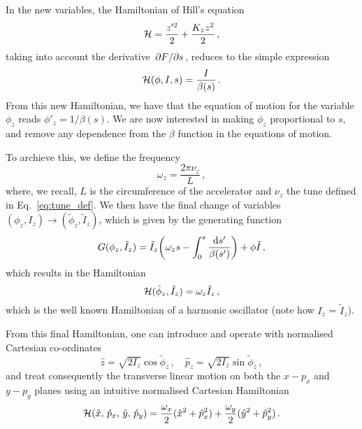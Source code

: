 In the new variables, the Hamiltonian of Hill's equation
\begin{equation} 
    \mathcal{H} = \frac{z'^2}{2} + \frac{K_z z^2}{2} \,,
\end{equation}
taking into account the derivative $\pdv*{F}{s}$, reduces to the simple expression
\begin{equation}
	\mathcal{H}(\phi,I,s) = \frac{I}{\beta(s)}\, .
\end{equation}
From this new Hamiltonian, we have that the equation of motion for the variable $\phi_z$ reads $\phi'_z = 1/\beta(s)$. We are now interested in making $\phi_z$ proportional to $s$, and remove any dependence from the $\beta$ function in the equations of motion.

To archieve this, we define the frequency
\begin{equation}
    \omega_z = \frac{2\pi\nu_z}{L} \,,
\end{equation}
where, we recall, $L$ is the circumference of the accelerator and $\nu_z$ the tune defined in Eq.~\eqref{eq:tune_def}. We then have the final change of variables $(\phi_z,I_z)\to(\tilde\phi_z, \tilde I_z)$, which is given by the generating function
%
\begin{equation}
	G(\phi_z,\tilde I_z) = \tilde I_z\qty(\omega_z s - \int_0^s\frac{\dd s'}{\beta(s')})+\phi\tilde I\, ,
\end{equation}
%
which results in the Hamiltonian
%
\begin{equation}
	\mathcal{H}(\tilde \phi_z,\tilde I_z) = \omega_z \tilde I_z\,,
	\label{eq:harm_ham}
 \end{equation}
%
which is the well known Hamiltonian of a harmonic oscillator (note how $I_z$ = $\tilde{I}_z$).

From this final Hamiltonian, one can introduce and operate with normalised Cartesian co-ordinates 
\begin{equation}
    \hat z=\sqrt{2I_z}\cos\tilde{\phi}_z\,,\quad \hat p_z=\sqrt{2I_z}\sin\tilde{\phi}_z \,,
    \label{eq:2:cart_eq}
\end{equation}
and treat consequently the transverse linear motion on both the $x-p_x$ and $y-p_y$ planes using an intuitive normalised Cartesian Hamiltonian
%
\begin{equation}
	\mathcal{H}(\hat x,\, \hat p_x,\, \hat y,\, \hat p_y) = \frac{\omega_x}{2}(\hat x^2 +\hat p_x^2) + \frac{\omega_y}{2}(\hat y^2+\hat p_y^2)\, .
	\label{eq:linham}
\end{equation}
%

